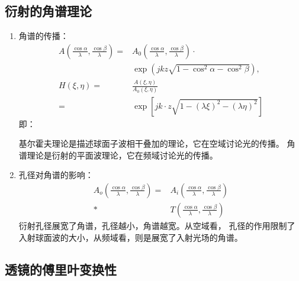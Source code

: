 \documentclass[twocolumn]{ctexart}
\begin{document}
\subsection{衍射的角谱理论}
\begin{enumerate}
    \item 角谱的传播：
    \begin{equation}
        \begin{aligned}
            A\left(\frac{\cos \alpha}{\lambda},\frac{\cos \beta}{\lambda}\right)=&A_0\left(\frac{\cos \alpha}{\lambda},\frac{\cos \beta}{\lambda}\right)\cdot\\
            &\exp \left(jkz\sqrt{1-\cos ^2 \alpha -\cos ^2 \beta}\right),\\
            H\left(\xi ,\eta \right)=&\frac{A\left(\xi ,\eta\right)}{A_0\left(\xi ,\eta\right)}\\
            =&\exp \left[jk\cdot z\sqrt{1-\left(\lambda \xi\right)^2-\left(\lambda \eta\right)^2}\right]
        \end{aligned}
        \nonumber
    \end{equation}
    即：\par
    基尔霍夫理论是描述球面子波相干叠加的理论，它在空域讨论光的传播。
    角谱理论是衍射的平面波理论，它在频域讨论光的传播。
    \item 孔径对角谱的影响：
    \begin{equation}
        \begin{aligned}
            A_o\left(\frac{\cos \alpha}{\lambda},\frac{\cos \beta}{\lambda}\right)=&A_i\left(\frac{\cos \alpha}{\lambda},\frac{\cos \beta}{\lambda}\right)\\
            \ast& T\left(\frac{\cos \alpha}{\lambda},\frac{\cos \beta}{\lambda}\right)
        \end{aligned}
        \nonumber
    \end{equation}
    衍射孔径展宽了角谱，孔径越小，角谱越宽。从空域看，
    孔径的作用限制了入射球面波的大小，从频域看，则是展宽了入射光场的角谱。
\end{enumerate}

\subsection{透镜的傅里叶变换性}
\end{document}
